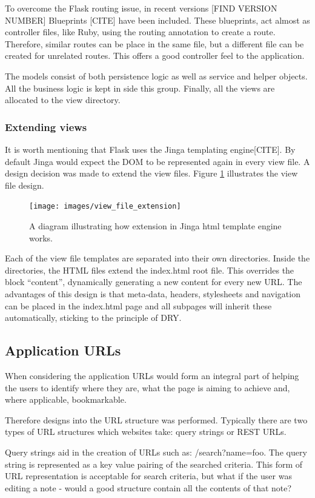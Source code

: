 To overcome the Flask routing issue, in recent versions [FIND VERSION NUMBER] Blueprints [CITE] have been included. These blueprints, act almost as controller files, like Ruby, using the routing annotation to create a route. Therefore, similar routes can be place in the same file, but a different file can be created for unrelated routes. This offers a good controller feel to the application.

The models consist of both persistence logic as well as service and helper objects. All the business logic is kept in side this group. Finally, all the views are allocated to the view directory.

\subsubsection{Extending views}
It is worth mentioning that Flask uses the Jinga templating engine[CITE]. By default Jinga would expect the DOM to be represented again in every view file. A design decision was made to extend the view files. Figure \ref{fig:extension} illustrates the view file design.
\begin{figure}[h]
  \centering
  \texttt{[image: images/view\_file\_extension]}
  \caption{A diagram illustrating how extension in Jinga html template engine works.}
  \label{fig:extension}
\end{figure}

Each of the view file templates are separated into their own directories. Inside the directories, the HTML files extend the index.html root file. This overrides the block ``content'', dynamically generating a new content for every new URL. The advantages of this design is that meta-data, headers, stylesheets and navigation can be placed in the index.html page and all subpages will inherit these automatically, sticking to the principle of DRY.

\subsection{Application URLs}
When considering the application URLs would form an integral part of helping the users to identify where they are, what the page is aiming to achieve and, where applicable, bookmarkable.

Therefore designs into the URL structure was performed. Typically there are two types of URL structures which websites take: query strings or REST URLs.

Query strings aid in the creation of URLs such as: /search?name=foo. The query string is represented as a key value pairing of the searched criteria. This form of URL representation is acceptable for search criteria, but what if the user was editing a note - would a good structure contain all the contents of that note?

